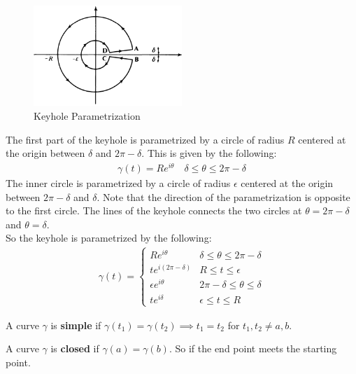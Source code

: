 \begin{example}
    \begin{figure}[H]
        \centering
        \includegraphics[width=0.5\textwidth]{LECTURE_4/parametrize.png}
        \caption{Keyhole Parametrization}
    \end{figure}
    The first part of the keyhole is parametrized by a circle of radius $R$ centered at the origin between $\delta$ and $2\pi - \delta$. This is given by the following:
    \begin{align*}
        \gamma (t) = Re^{i\theta} \quad \delta \leq \theta \leq 2 \pi - \delta
    \end{align*}
    The inner circle is parametrized by a circle of radius $\epsilon$ centered at the origin between $2\pi - \delta$ and $\delta$. Note that the direction of the parametrization is opposite to the first circle.
    The lines of the keyhole connects the two circles at $\theta = 2\pi - \delta$ and $\theta = \delta$.\\
    So the keyhole is parametrized by the following:
    \begin{align*}
        \gamma (t) = \begin{cases}
                         Re^{i\theta}          & \delta \leq \theta \leq 2\pi - \delta \\
                         te^{i(2\pi - \delta)} & R \leq t \leq \epsilon                \\
                         \epsilon e^{i\theta}  & 2\pi - \delta \leq \theta \leq \delta \\
                         te^{i\delta}          & \epsilon \leq t \leq R
                     \end{cases}
    \end{align*}
    \label{ex:keyhole}
\end{example}



\begin{definition}
    A curve $\gamma$ is \textbf{simple} if $\gamma(t_1) = \gamma(t_2) \implies t_1 = t_2$ for $t_1, t_2 \neq a, b$.
\end{definition}
\begin{definition}
    A curve $\gamma$ is \textbf{closed} if $\gamma(a) = \gamma(b)$. So if the end point meets the starting point.
\end{definition}

